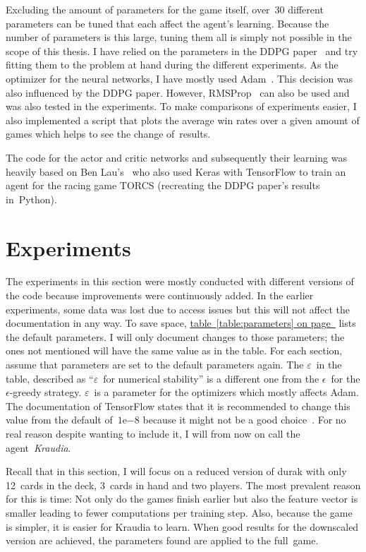 \documentclass[a4paper,titlepage]{article}
\newcommand{\expn}[2]{{#1}\mathrm{e}{#2}}
\begin{document}
Excluding the amount of parameters for the game itself, over~30 different parameters can be tuned that each affect the agent's learning.
Because the number of parameters is this large, tuning them all is simply not possible in the scope of this thesis. I have relied on the parameters in the DDPG paper~\cite[p.~11]{ddpg} and try fitting them to the problem at hand during the different experiments.
As the optimizer for the neural networks, I have mostly used Adam~\cite{adam}. This decision was also influenced by the DDPG paper. However, RMSProp~\cite{rmsprop} can also be used and was also tested in the experiments.
To make comparisons of experiments easier, I also implemented a script that plots the average win rates over a given amount of games which helps to see the change of~results. \medskip

The code for the actor and critic networks and subsequently their learning was heavily based on Ben Lau's~\cite{torcs} who also used Keras with TensorFlow to train an agent for the racing game TORCS (recreating the DDPG paper's results in~Python).

\newpage

\section{Experiments}

The experiments in this section were mostly conducted with different versions of the code because improvements were continuously added. In the earlier experiments, some data was lost due to access issues but this will not affect the documentation in any way.
To save space, \hyperref[table:parameters]{table~\ref*{table:parameters} on page~\pageref*{table:parameters}} lists the default parameters.
I will only document changes to those parameters; the ones not mentioned will have the same value as in the table. For each section, assume that parameters are set to the default parameters again. The $\varepsilon$~in the table, described as ``$\varepsilon$~for numerical stability'' is a different one from the $\epsilon$~for the $\epsilon$-greedy strategy. $\varepsilon$~is a parameter for the optimizers which mostly affects Adam. The documentation of TensorFlow states that it is recommended to change this value from the default of~$\expn{1}{-8}$ because it might not be a good choice~\cite{tfadam}. For no real reason despite wanting to include it, I will from now on call the agent~\emph{Kraudia}.

Recall that in this section, I will focus on a reduced version of durak with only 12~cards in the deck, 3~cards in hand and two players. The most prevalent reason for this is time: Not only do the games finish earlier but also the feature vector is smaller leading to fewer computations per training step.
Also, because the game is simpler, it is easier for Kraudia to learn. When good results for the downscaled version are achieved, the parameters found are applied to the full~game.
\end{document}
